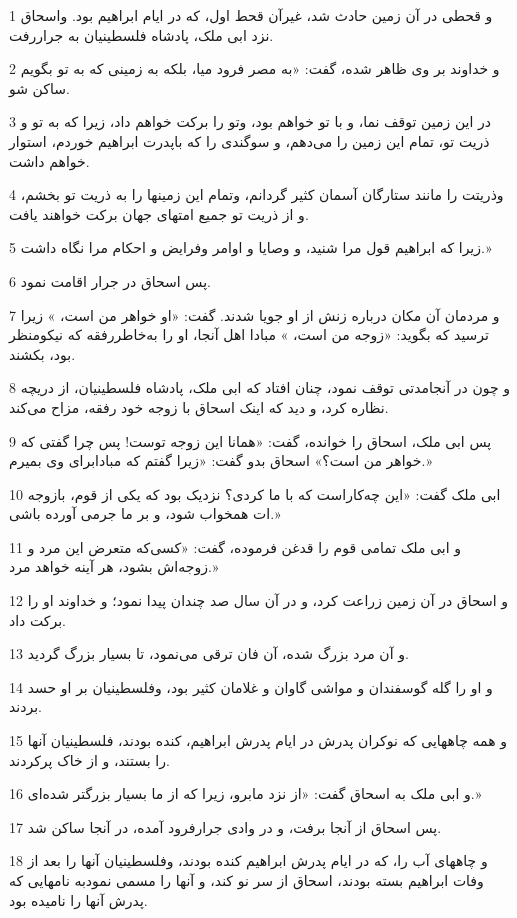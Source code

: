 \par 1 و قحطی در آن زمین حادث شد، غیرآن قحط اول، که در ایام ابراهیم بود. واسحاق نزد ابی ملک، پادشاه فلسطینیان به جراررفت.
\par 2 و خداوند بر وی ظاهر شده، گفت: «به مصر فرود میا، بلکه به زمینی که به تو بگویم ساکن شو.
\par 3 در این زمین توقف نما، و با تو خواهم بود، وتو را برکت خواهم داد، زیرا که به تو و ذریت تو، تمام این زمین را می‌دهم، و سوگندی را که باپدرت ابراهیم خوردم، استوار خواهم داشت.
\par 4 وذریتت را مانند ستارگان آسمان کثیر گردانم، وتمام این زمینها را به ذریت تو بخشم، و از ذریت تو جمیع امتهای جهان برکت خواهند یافت.
\par 5 زیرا که ابراهیم قول مرا شنید، و وصایا و اوامر وفرایض و احکام مرا نگاه داشت.»
\par 6 پس اسحاق در جرار اقامت نمود.
\par 7 و مردمان آن مکان درباره زنش از او جویا شدند. گفت: «او خواهر من است، » زیرا ترسید که بگوید: «زوجه من است، » مبادا اهل آنجا، او را به‌خاطررفقه که نیکومنظر بود، بکشند.
\par 8 و چون در آنجامدتی توقف نمود، چنان افتاد که ابی ملک، پادشاه فلسطینیان، از دریچه نظاره کرد، و دید که اینک اسحاق با زوجه خود رفقه، مزاح می‌کند.
\par 9 پس ابی ملک، اسحاق را خوانده، گفت: «همانا این زوجه توست! پس چرا گفتی که خواهر من است؟» اسحاق بدو گفت: «زیرا گفتم که مبادابرای وی بمیرم.»
\par 10 ابی ملک گفت: «این چه‌کاراست که با ما کردی؟ نزدیک بود که یکی از قوم، بازوجه ات همخواب شود، و بر ما جرمی آورده باشی.»
\par 11 و ابی ملک تمامی قوم را قدغن فرموده، گفت: «کسی‌که متعرض این مرد و زوجه‌اش بشود، هر آینه خواهد مرد.»
\par 12 و اسحاق در آن زمین زراعت کرد، و در آن سال صد چندان پیدا نمود؛ و خداوند او را برکت داد.
\par 13 و آن مرد بزرگ شده، آن فان ترقی می‌نمود، تا بسیار بزرگ گردید.
\par 14 و او را گله گوسفندان و مواشی گاوان و غلامان کثیر بود، وفلسطینیان بر او حسد بردند.
\par 15 و همه چاههایی که نوکران پدرش در ایام پدرش ابراهیم، کنده بودند، فلسطینیان آنها را بستند، و از خاک پرکردند.
\par 16 و ابی ملک به اسحاق گفت: «از نزد مابرو، زیرا که از ما بسیار بزرگتر شده‌ای.»
\par 17 پس اسحاق از آنجا برفت، و در وادی جرارفرود آمده، در آنجا ساکن شد.
\par 18 و چاههای آب را، که در ایام پدرش ابراهیم کنده بودند، وفلسطینیان آنها را بعد از وفات ابراهیم بسته بودند، اسحاق از سر نو کند، و آنها را مسمی نمودبه نامهایی که پدرش آنها را نامیده بود.
